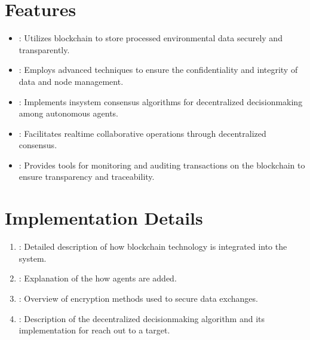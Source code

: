 \documentclass[a4paper,10pt,english]{sphinxmanual}
\let\sphinxpxdimen\pdfpxdimen\else\newdimen\sphinxpxdimen
\begin{document}
\section{Features}
\label{\detokenize{overview:features}}\begin{itemize}
\item {} 
\sphinxAtStartPar
{}: Utilizes blockchain to store processed environmental data securely and transparently.

\item {} 
\sphinxAtStartPar
{}: Employs advanced techniques to ensure the confidentiality and integrity of data and node management.

\item {} 
\sphinxAtStartPar
{}: Implements in\sphinxhyphen{}system consensus algorithms for decentralized decision\sphinxhyphen{}making among autonomous agents.

\item {} 
\sphinxAtStartPar
{}: Facilitates real\sphinxhyphen{}time collaborative operations through decentralized consensus.

\item {} 
\sphinxAtStartPar
{}: Provides tools for monitoring and auditing transactions on the blockchain to ensure transparency and traceability.

\end{itemize}

\noindent{\hspace*{\fill}\sphinxincludegraphics[width=600\sphinxpxdimen]{{latest_transactions}.png}\hspace*{\fill}}


\section{Implementation Details}
\label{\detokenize{overview:implementation-details}}\begin{enumerate}
%
\item {} 
\sphinxAtStartPar
{}: Detailed description of how blockchain technology is integrated into the system.

\item {} 
\sphinxAtStartPar
{}: Explanation of the how agents are added.

\item {} 
\sphinxAtStartPar
{}: Overview of encryption methods used to secure data exchanges.

\item {} 
\sphinxAtStartPar
{}: Description of the decentralized decision\sphinxhyphen{}making algorithm and its implementation for reach out to a target.

\end{enumerate}
\end{document}
